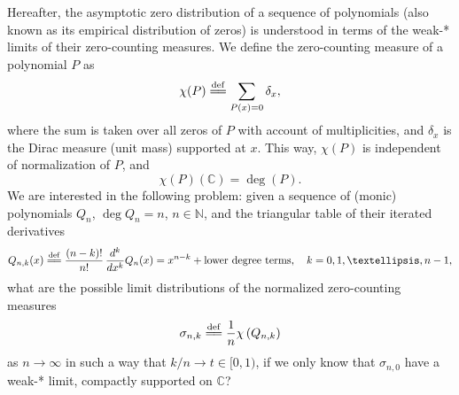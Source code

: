 \documentclass[reqno,11pt]{amsart}
\theoremstyle{plain}
\theoremstyle{definition}
\theoremstyle{remark}
\numberwithin{equation}{section}
\numberwithin{equation}{section}
\newcommand{\N}{\mathbb{N}}
\newcommand{\C}{\mathbb{C}}
\newcommand{\isdef}{\overset{\mathrm{def}}{=\joinrel=}}
\begin{document}
Hereafter, the asymptotic zero distribution of a sequence of polynomials (also known as its empirical distribution of zeros) is understood in terms of the weak-* limits of their zero-counting measures. We define the zero-counting measure  of a polynomial $P$ as 
\begin{equation} \label{eq:countingmeasure}
	\chi(P)\isdef \sum_{P(x)=0} \delta_x,
\end{equation}
where the sum is taken over all zeros of $P$ with account of multiplicities, and $\delta_x$ is the Dirac measure (unit mass) supported at $x$. This way,  $\chi(P)$ is independent of  normalization of $P$, and  
$$
\chi(P)(\mathbb{C})=\deg(P).
$$ 
We are interested in the following problem: given a sequence of (monic) polynomials $Q_n$, $\deg Q_n=n$, $n\in \N$, and the triangular table of their iterated derivatives 
\begin{equation}
    \label{def:QN}
Q_{n,k}(x) \isdef  \frac{(n-k)!}{n!}\, \frac{d^k}{dx^k } Q_n(x) = x^{n-k}+\text{lower degree terms}, \quad k=0, 1, \dots, n-1,
\end{equation}
what are the possible limit distributions of the normalized zero-counting measures
\begin{equation} \label{eq:defSigmaNK}
\sigma_{n,k} \isdef  \frac{1}{ n} \chi\left(Q_{n, k }\right)  
\end{equation}
as $n\to \infty$ in such a way that $k/n\to t\in [0,1)$, if we only know that $\sigma_{n,0}$ have a weak-* limit, compactly supported on $\C$?
\end{document}
